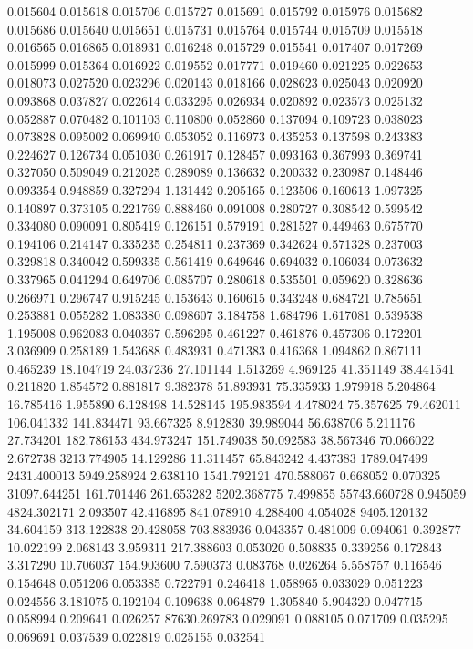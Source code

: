 0.015604
0.015618
0.015706
0.015727
0.015691
0.015792
0.015976
0.015682
0.015686
0.015640
0.015651
0.015731
0.015764
0.015744
0.015709
0.015518
0.016565
0.016865
0.018931
0.016248
0.015729
0.015541
0.017407
0.017269
0.015999
0.015364
0.016922
0.019552
0.017771
0.019460
0.021225
0.022653
0.018073
0.027520
0.023296
0.020143
0.018166
0.028623
0.025043
0.020920
0.093868
0.037827
0.022614
0.033295
0.026934
0.020892
0.023573
0.025132
0.052887
0.070482
0.101103
0.110800
0.052860
0.137094
0.109723
0.038023
0.073828
0.095002
0.069940
0.053052
0.116973
0.435253
0.137598
0.243383
0.224627
0.126734
0.051030
0.261917
0.128457
0.093163
0.367993
0.369741
0.327050
0.509049
0.212025
0.289089
0.136632
0.200332
0.230987
0.148446
0.093354
0.948859
0.327294
1.131442
0.205165
0.123506
0.160613
1.097325
0.140897
0.373105
0.221769
0.888460
0.091008
0.280727
0.308542
0.599542
0.334080
0.090091
0.805419
0.126151
0.579191
0.281527
0.449463
0.675770
0.194106
0.214147
0.335235
0.254811
0.237369
0.342624
0.571328
0.237003
0.329818
0.340042
0.599335
0.561419
0.649646
0.694032
0.106034
0.073632
0.337965
0.041294
0.649706
0.085707
0.280618
0.535501
0.059620
0.328636
0.266971
0.296747
0.915245
0.153643
0.160615
0.343248
0.684721
0.785651
0.253881
0.055282
1.083380
0.098607
3.184758
1.684796
1.617081
0.539538
1.195008
0.962083
0.040367
0.596295
0.461227
0.461876
0.457306
0.172201
3.036909
0.258189
1.543688
0.483931
0.471383
0.416368
1.094862
0.867111
0.465239
18.104719
24.037236
27.101144
1.513269
4.969125
41.351149
38.441541
0.211820
1.854572
0.881817
9.382378
51.893931
75.335933
1.979918
5.204864
16.785416
1.955890
6.128498
14.528145
195.983594
4.478024
75.357625
79.462011
106.041332
141.834471
93.667325
8.912830
39.989044
56.638706
5.211176
27.734201
182.786153
434.973247
151.749038
50.092583
38.567346
70.066022
2.672738
3213.774905
14.129286
11.311457
65.843242
4.437383
1789.047499
2431.400013
5949.258924
2.638110
1541.792121
470.588067
0.668052
0.070325
31097.644251
161.701446
261.653282
5202.368775
7.499855
55743.660728
0.945059
4824.302171
2.093507
42.416895
841.078910
4.288400
4.054028
9405.120132
34.604159
313.122838
20.428058
703.883936
0.043357
0.481009
0.094061
0.392877
10.022199
2.068143
3.959311
217.388603
0.053020
0.508835
0.339256
0.172843
3.317290
10.706037
154.903600
7.590373
0.083768
0.026264
5.558757
0.116546
0.154648
0.051206
0.053385
0.722791
0.246418
1.058965
0.033029
0.051223
0.024556
3.181075
0.192104
0.109638
0.064879
1.305840
5.904320
0.047715
0.058994
0.209641
0.026257
87630.269783
0.029091
0.088105
0.071709
0.035295
0.069691
0.037539
0.022819
0.025155
0.032541
